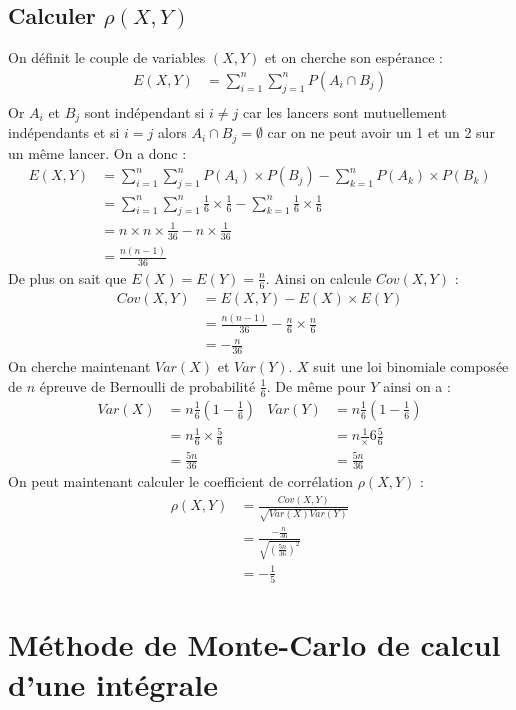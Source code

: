 \documentclass[10pt,a4paper,twoside]{article}
\begin{document}
\subsection{Calculer $\rho(X,Y)$}
On définit le couple de variables $(X,Y)$ et on cherche son espérance :
\begin{align*}
E(X,Y) &= \sum_{i=1}^{n}\sum_{j=1}^{n} P(A_{i}\cap B_{j})\\
\end{align*}
Or $A_{i}$ et $B_{j}$ sont indépendant si $i\neq j$ car les lancers sont mutuellement indépendants et si $i=j$ alors $A_{i}\cap B_{j} = \emptyset$ car on ne peut avoir un 1 et un 2 sur un même lancer. On a donc :
\begin{align*}
E(X,Y) &= \sum_{i=1}^{n}\sum_{j=1}^{n} P(A_{i})\times P(B_{j}) - \sum_{k=1}^{n} P(A_{k})\times P(B_{k})\\
&= \sum_{i=1}^{n}\sum_{j=1}^{n} \frac{1}{6}\times \frac{1}{6} - \sum_{k=1}^{n} \frac{1}{6} \times \frac{1}{6}\\
&= n\times n\times \frac{1}{36} - n \times \frac{1}{36}\\
&= \frac{n(n-1)}{36}
\end{align*}
De plus on sait que $E(X)=E(Y)=\frac{n}{6}$. Ainsi on calcule $Cov(X,Y)$ :
\begin{align*}
Cov(X,Y) &= E(X,Y) - E(X) \times E(Y)\\
 & = \frac{n(n-1)}{36} - \frac{n}{6} \times \frac{n}{6}\\
 & = -\frac{n}{36}
\end{align*}
On cherche maintenant $Var(X)$ et $Var(Y)$. $X$ suit une loi binomiale composée de $n$ épreuve de Bernoulli de probabilité $\frac{1}{6}$. De même pour $Y$ ainsi on a :
\begin{align*}
Var(X) &= n\frac{1}{6}\left(1-\frac{1}{6}\right) & Var(Y) &= n\frac{1}{6}\left(1-\frac{1}{6}\right)\\
&= n\frac{1}{6}\times\frac{5}{6} & &= n\frac{1}\times{6}\frac{5}{6}\\
&= \frac{5n}{36} & &= \frac{5n}{36}
\end{align*}
On peut maintenant calculer le coefficient de corrélation $\rho(X,Y)$ :
\begin{align*}
\rho(X,Y) &= \frac{Cov(X,Y)}{\sqrt{Var(X)Var(Y)}}\\
&= \frac{-\frac{n}{36}}{\sqrt{\left(\frac{5n}{36}\right)^{2}}}\\
&= -\frac{1}{5}
\end{align*}

\section{Méthode de Monte-Carlo de calcul d'une intégrale}
\end{document}
